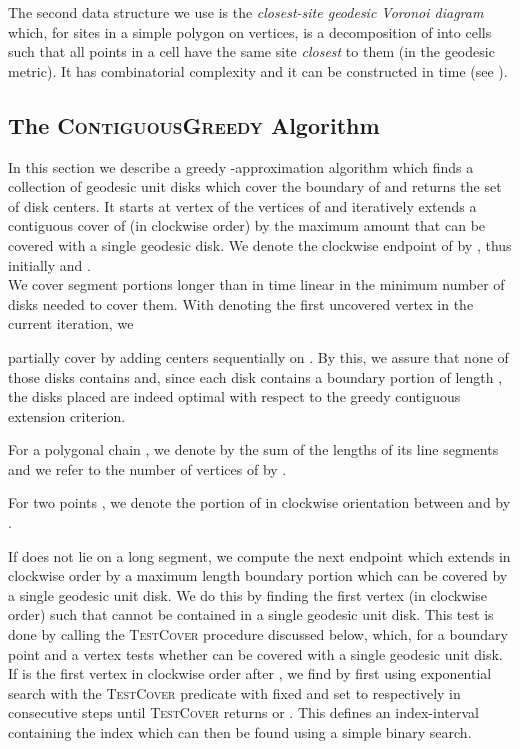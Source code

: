 \documentclass{llncs}
\begin{document}
{The second data structure we use is the \emph{closest-site geodesic Voronoi diagram}  { which, for  sites in a simple polygon  on  vertices,}
is a decomposition of  into cells such that all points in a cell have the same site \emph{closest} to them {(in the geodesic metric)}. It has combinatorial complexity  and it can be constructed in time  (see \cite{borisClose}). 

\subsection{The \textsc{ContiguousGreedy} Algorithm}
In this section we describe a greedy -approximation algorithm which finds a collection of geodesic unit disks which cover the boundary of  and returns the set of disk centers. It starts at vertex  of  the vertices  of  and {iteratively extends a contiguous cover  of   (in clockwise order) by the maximum amount that can be covered with a single geodesic disk.} We denote the clockwise endpoint of  by , thus initially  and . \\


We cover segment portions longer than  in time linear in the minimum number of disks needed to cover them. With  denoting the first uncovered vertex in the current iteration, we}  partially cover  by adding  {centers sequentially on }.  By this, we assure that none of  {those disks} contains  and, since each disk contains a boundary portion of length , the disks placed are indeed optimal with respect to the greedy contiguous extension criterion.






\begin{definition}
For a polygonal chain , we denote by  the sum of the lengths of its line segments and we refer to the number of vertices of  by .
\end{definition}

\begin{definition}
For two points , we denote the portion of  in clockwise orientation between  and  by .
\end{definition}



If  does not lie on a long segment, we compute the next endpoint  which extends  in clockwise order by a maximum length boundary portion which can be covered by a single geodesic unit disk. We do this   by finding the first vertex  (in clockwise order) such that  cannot be contained in a single geodesic unit disk. This test is done by calling the \textsc{TestCover} procedure discussed below, which, for a boundary point  and a vertex  tests whether  can be covered with a single geodesic unit disk.  
 {If  is the first vertex in clockwise order after , we find  by first using exponential search with the \textsc{TestCover} predicate with   fixed and  set to  respectively in consecutive steps until \textsc{TestCover} returns  or .} 
This defines an {index}-interval containing {the index}  which can then be found using a simple binary search. 
\end{document}
